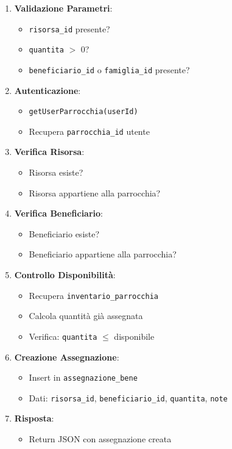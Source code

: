 \documentclass{article}
\begin{document}
\begin{enumerate}[leftmargin=*]
\item \textbf{Validazione Parametri}:
   \begin{itemize}
   \item \texttt{risorsa\_id} presente?
   \item \texttt{quantita} $>$ 0?
   \item \texttt{beneficiario\_id} o \texttt{famiglia\_id} presente?
   \end{itemize}

\item \textbf{Autenticazione}:
   \begin{itemize}
   \item \texttt{getUserParrocchia(userId)}
   \item Recupera \texttt{parrocchia\_id} utente
   \end{itemize}

\item \textbf{Verifica Risorsa}:
   \begin{itemize}
   \item Risorsa esiste?
   \item Risorsa appartiene alla parrocchia?
   \end{itemize}

\item \textbf{Verifica Beneficiario}:
   \begin{itemize}
   \item Beneficiario esiste?
   \item Beneficiario appartiene alla parrocchia?
   \end{itemize}

\item \textbf{Controllo Disponibilità}:
   \begin{itemize}
   \item Recupera \texttt{inventario\_parrocchia}
   \item Calcola quantità già assegnata
   \item Verifica: \texttt{quantita} $\leq$ disponibile
   \end{itemize}

\item \textbf{Creazione Assegnazione}:
   \begin{itemize}
   \item Insert in \texttt{assegnazione\_bene}
   \item Dati: \texttt{risorsa\_id}, \texttt{beneficiario\_id}, \texttt{quantita}, \texttt{note}
   \end{itemize}

\item \textbf{Risposta}:
   \begin{itemize}
   \item Return JSON con assegnazione creata
   \end{itemize}
\end{enumerate}
\end{document}
